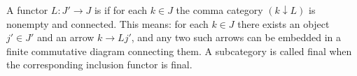 A functor $L : J' \to J$ is  if for each $k \in J$ the comma category $(k \downarrow L)$ is nonempty and connected. This means: for each $k \in J$ there exists an object $j' \in J'$ and an arrow $k \to L j'$, and any two such arrows can be embedded in a finite commutative diagram connecting them. A subcategory is called final when the corresponding inclusion functor is final.
